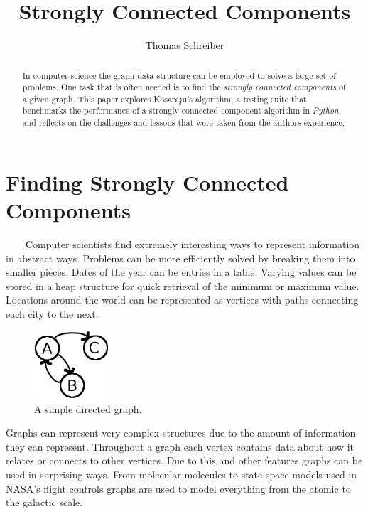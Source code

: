 \documentclass[12pt]{article}
\begin{document}
\title{Strongly Connected Components}
\author{Thomas Schreiber}
\maketitle



\begin{abstract}
In computer science the graph data structure can be employed to solve a large set of problems. One task that is often needed is to find the \emph{strongly connected components} of a given graph. This paper explores Kosaraju's algorithm, a testing suite that benchmarks the performance of a strongly connected component algorithm in \emph{Python}, and reflects on the challenges and lessons that were taken from the authors experience.
\end{abstract}


\section{Finding Strongly Connected Components}

\ \ \ \ Computer scientists find extremely interesting ways to represent information in abstract ways. Problems can be more efficiently solved by breaking them into smaller pieces. Dates of the year can be entries in a table. Varying values can be stored in a heap structure for quick retrieval of the minimum or maximum value. Locations around the world can be represented as vertices with paths connecting each city to the next.

\begin{figure}[h!]
  \centering
  \includegraphics[width=0.25\textwidth]{simplegraph.png}
    \caption{A simple directed graph.}
\end{figure}

Graphs can represent very complex structures due to the amount of information they can represent. Throughout a graph each vertex contains data about how it relates or connects to other vertices. Due to this and other features graphs can be used in surprising ways. From molecular molecules to state-space models used in NASA's flight controls\cite{NASA} graphs are used to model everything from the atomic to the galactic scale.
\end{document}
